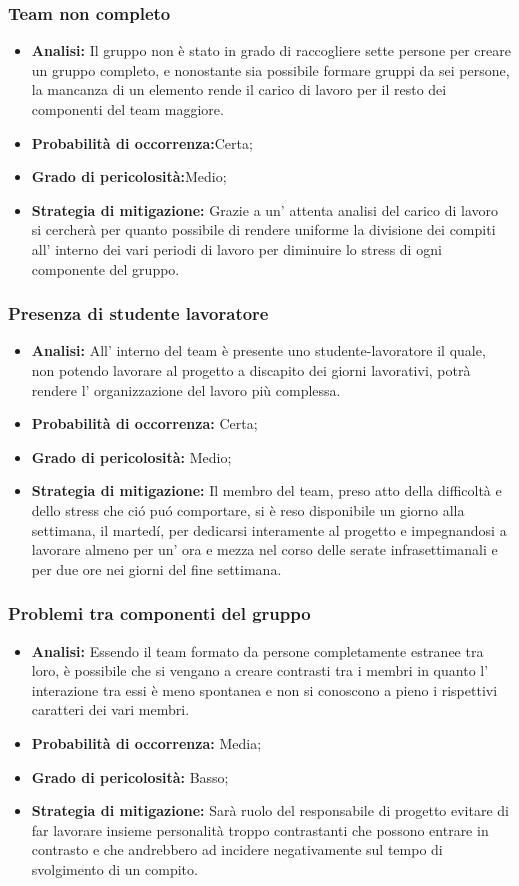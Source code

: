 \subsubsection{Team non completo}
	\begin{itemize}
	\item \textbf{Analisi: }Il gruppo non è stato in grado di raccogliere sette persone per creare un gruppo completo, e nonostante sia possibile formare gruppi da sei persone, la mancanza di un elemento rende il carico di lavoro per il resto dei componenti del team maggiore.
	\item \textbf{Probabilità di occorrenza:}Certa;
	\item \textbf{Grado di pericolosità:}Medio;
	\item \textbf{Strategia di mitigazione: }Grazie a un' attenta analisi del carico di lavoro si cercherà per quanto possibile di rendere uniforme la divisione dei compiti all' interno dei vari periodi di lavoro per diminuire lo stress di ogni componente del gruppo.
	\end{itemize}
\subsubsection{Presenza di studente lavoratore}
	\begin{itemize}
	\item \textbf{Analisi: }All' interno del team \gruppo è presente uno studente-lavoratore il quale, non potendo lavorare al progetto a discapito dei giorni lavorativi, potrà rendere l' organizzazione del lavoro più complessa.
	\item \textbf{Probabilità di occorrenza:} Certa;
	\item \textbf{Grado di pericolosità:} Medio;
	\item \textbf{Strategia di mitigazione: }Il membro del team, preso atto della difficoltà e dello stress che ci\'o pu\'o comportare, si è reso disponibile un giorno alla settimana, il marted\'i, per dedicarsi interamente al progetto e impegnandosi a lavorare almeno per un' ora e mezza nel corso delle serate infrasettimanali e per due ore nei giorni del fine settimana.	
	\end{itemize}
\subsubsection{Problemi tra componenti del gruppo}
	\begin{itemize}
	\item \textbf{Analisi: }Essendo il team \gruppo formato da persone completamente estranee tra loro, è possibile che si vengano a creare contrasti tra i membri in quanto l' interazione tra essi è meno spontanea e non si conoscono a pieno i rispettivi caratteri dei vari membri.
	\item \textbf{Probabilità di occorrenza:} Media;
	\item \textbf{Grado di pericolosità:} Basso;
	\item \textbf{Strategia di mitigazione: }Sarà ruolo del responsabile di progetto evitare di far lavorare insieme personalità troppo contrastanti che possono entrare in contrasto e che andrebbero ad incidere negativamente sul tempo di svolgimento di un compito.
	\end{itemize}
